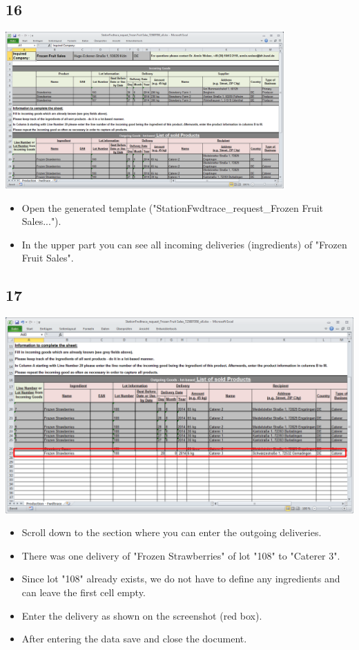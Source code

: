\documentclass{beamer}
\begin{document}
\subsection{16}
\begin{frame}
	\begin{center}
  		\includegraphics[width=0.8\textwidth]{16.png}
	\end{center}
	\begin{itemize}
		\item Open the generated template ("StationFwdtrace\_request\_Frozen Fruit Sales...").
		\item In the upper part you can see all incoming deliveries (ingredients) of "Frozen Fruit Sales".
	\end{itemize}
\end{frame}

\subsection{17}
\begin{frame}
	\begin{center}
  		\includegraphics[height=0.5\textheight]{17.png}
	\end{center}
	\begin{itemize}
		\item Scroll down to the section where you can enter the outgoing deliveries.
		\item There was one delivery of "Frozen Strawberries" of lot "108" to "Caterer 3".
		\item Since lot "108" already exists, we do not have to define any ingredients and can leave the first cell empty.
		\item Enter the delivery as shown on the screenshot (red box).
		\item After entering the data save and close the document.
	\end{itemize}
\end{frame}
\end{document}

